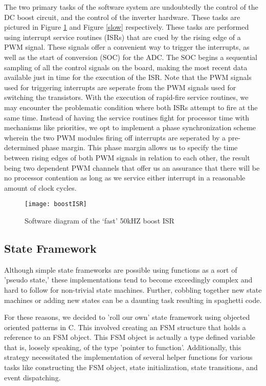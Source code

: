 The two primary tasks of the software system are undoubtedly the control of the DC boost circuit, and the control of the inverter hardware. These tasks are pictured in Figure \ref{fast} and Figure \ref{slow} respectively. These tasks are performed using interrupt service routines (ISRs) that are cued by the rising edge of a PWM signal. These signals offer a convenient way to trigger the interrupts, as well as the start of conversion (SOC) for the ADC. The SOC begins a sequential sampling of all the control signals on the board, making the most recent data available just in time for the execution of the ISR. Note that the PWM signals used for triggering interrupts are seperate from the PWM signals used for switching the transistors. With the execution of rapid-fire service routines, we may encounter the problematic condition where both ISRs attempt to fire at the same time. Instead of having the service routines fight for processor time with mechanisms like priorities, we opt to implement a phase synchronization scheme wherein the two PWM modules firing off interrupts are seperated by a pre-determined phase margin. This phase margin allows us to specify the time between rising edges of both PWM signals in relation to each other, the result being two dependent PWM channels that offer us an assurance that there will be no processor contention as long as we service either interrupt in a reasonable amount of clock cycles.

\begin{figure}[h]
\begin{center}
\texttt{[image: boostISR]}
\caption{Software diagram of the `fast' 50kHZ boost ISR}
\label{fast}
\end{center}
\end{figure}

\subsection{State Framework}
Although simple state frameworks are possible using functions as a sort of 'pseudo state,' these implementations tend to become exceedingly complex and hard to follow for non-trivial state machines. Further, cobbling together new state machines or adding new states can be a daunting task resulting in spaghetti code. 

For these reasons, we decided to 'roll our own' state framework using objected oriented patterns in C. This involved creating an FSM structure that holds a reference to an FSM object. This FSM object is actually a type defined variable that is, loosely speaking, of the type 'pointer to function'. Additionally, this strategy necessitated the implementation of several helper functions for various tasks like constructing the FSM object, state initialization, state transitions, and event dispatching. 

